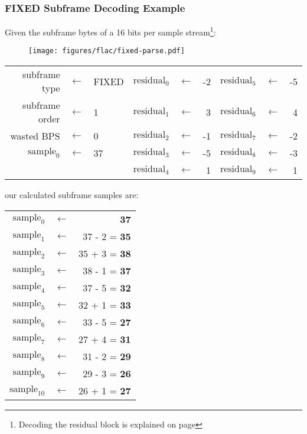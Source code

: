 \clearpage

\subsubsection{FIXED Subframe Decoding Example}

Given the subframe bytes of a 16 bits per sample stream\footnote{Decoding the residual block is explained on page \pageref{residual_decoding_example}}:
\begin{figure}[h]
\texttt{[image: figures/flac/fixed-parse.pdf]}
\end{figure}
\par
\noindent
\begin{tabular}{rcl|rcr|rcr}
subframe type & $\leftarrow$ & FIXED &
$\text{residual}_0$ & $\leftarrow$ & -2 &
$\text{residual}_5$ & $\leftarrow$ & -5 \\
subframe order & $\leftarrow$ & 1 &
$\text{residual}_1$ & $\leftarrow$ & 3 &
$\text{residual}_6$ & $\leftarrow$ & 4 \\
wasted BPS & $\leftarrow$ & 0 &
$\text{residual}_2$ & $\leftarrow$ & -1 &
$\text{residual}_7$ & $\leftarrow$ & -2 \\
$\text{sample}_0$ & $\leftarrow$ & 37 &
$\text{residual}_3$ & $\leftarrow$ & -5 &
$\text{residual}_8$ & $\leftarrow$ & -3 \\
& & &
$\text{residual}_4$ & $\leftarrow$ & 1 &
$\text{residual}_9$ & $\leftarrow$ & 1 \\
\end{tabular}
\par
\noindent
our calculated subframe samples are:
\par
\noindent
\begin{tabular}{rcr}
$\text{sample}_0$ & $\leftarrow$ & \textbf{37} \\
$\text{sample}_1$ & $\leftarrow$ & 37 - 2 = \textbf{35} \\
$\text{sample}_2$ & $\leftarrow$ & 35 + 3 = \textbf{38} \\
$\text{sample}_3$ & $\leftarrow$ & 38 - 1 = \textbf{37} \\
$\text{sample}_4$ & $\leftarrow$ & 37 - 5 = \textbf{32} \\
$\text{sample}_5$ & $\leftarrow$ & 32 + 1 = \textbf{33} \\
$\text{sample}_6$ & $\leftarrow$ & 33 - 5 = \textbf{27} \\
$\text{sample}_7$ & $\leftarrow$ & 27 + 4 = \textbf{31} \\
$\text{sample}_8$ & $\leftarrow$ & 31 - 2 = \textbf{29} \\
$\text{sample}_9$ & $\leftarrow$ & 29 - 3 = \textbf{26} \\
$\text{sample}_{10}$ & $\leftarrow$ & 26 + 1 = \textbf{27} \\
\end{tabular}

